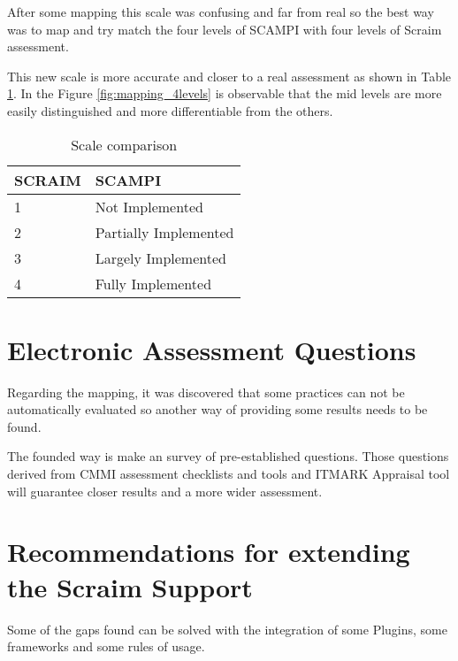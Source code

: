After some mapping this scale was confusing and far from real so the best way was to map and try match the four levels of SCAMPI with four levels of Scraim assessment.

This new scale is more accurate and closer to a real assessment as shown in Table \ref{tab:rules}. In the Figure \ref{fig:mapping_4levels} is observable that the mid levels are more easily distinguished and more differentiable from the others.

\begin{table}[h]
	\centering
	\caption{Scale comparison}
	\begin{tabular}{|p{2cm}|p{4cm}|}
		\hline
		SCRAIM   & SCAMPI    \\
		\hline
		1 & Not Implemented\\
				\hline
				2 & Partially Implemented\\
				\hline
				3 & Largely Implemented\\
				\hline
				4 & Fully Implemented\\
				\hline
	\end{tabular}
	\label{tab:rules}
\end{table}

\section{Electronic Assessment Questions} \label{sec:question}

Regarding the mapping, it was discovered  that some practices can not be automatically evaluated so another way of providing some results needs to be found.

The founded way is make an survey of pre-established questions. Those questions derived from CMMI assessment checklists and tools and ITMARK Appraisal tool will guarantee closer results and a more wider assessment.

\section{Recommendations for extending the Scraim Support}

Some of the gaps found can be solved with the integration of some Plugins, some frameworks and some rules of usage.

